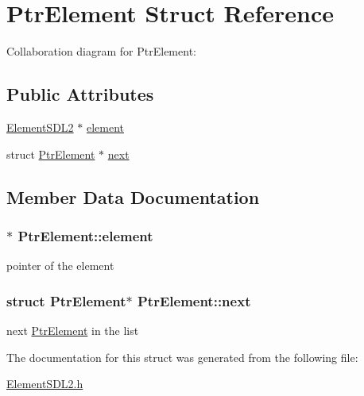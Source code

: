 \hypertarget{structPtrElement}{}\section{Ptr\+Element Struct Reference}
\label{structPtrElement}


Collaboration diagram for Ptr\+Element\+:
\subsection*{Public Attributes}
\begin{DoxyCompactItemize}
\item 
\hyperlink{structElementSDL2}{Element\+S\+D\+L2} $\ast$ \hyperlink{structPtrElement_ab98d72210e939fbe5de20d8a53bc3ddf}{element}
\item 
struct \hyperlink{structPtrElement}{Ptr\+Element} $\ast$ \hyperlink{structPtrElement_a47ef3a7e16db4568be2fbef257873a07}{next}
\end{DoxyCompactItemize}


\subsection{Member Data Documentation}
\subsubsection[{\texorpdfstring{element}{element}}]{$\ast$ Ptr\+Element\+::element}\hypertarget{structPtrElement_ab98d72210e939fbe5de20d8a53bc3ddf}{}\label{structPtrElement_ab98d72210e939fbe5de20d8a53bc3ddf}
pointer of the element 
\subsubsection[{\texorpdfstring{next}{next}}]{\setlength{\rightskip}{0pt plus 5cm}struct {\bf Ptr\+Element}$\ast$ Ptr\+Element\+::next}\hypertarget{structPtrElement_a47ef3a7e16db4568be2fbef257873a07}{}\label{structPtrElement_a47ef3a7e16db4568be2fbef257873a07}
next \hyperlink{structPtrElement}{Ptr\+Element} in the list 

The documentation for this struct was generated from the following file\+:\begin{DoxyCompactItemize}
\item 
\hyperlink{ElementSDL2_8h}{Element\+S\+D\+L2.\+h}\end{DoxyCompactItemize}
